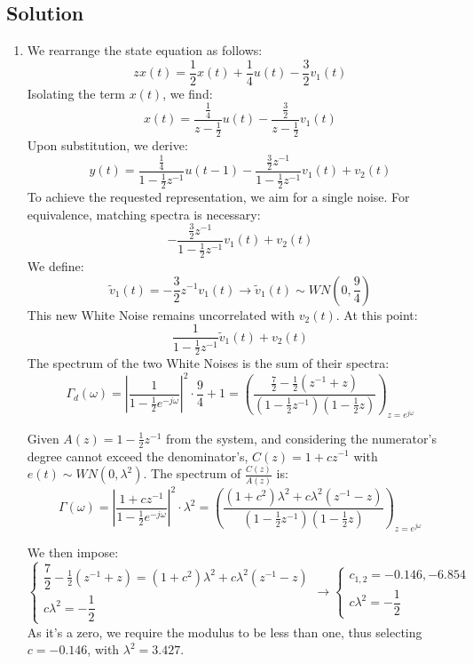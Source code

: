 \subsection*{Solution}
\begin{enumerate}
    \item We rearrange the state equation as follows:
        \[zx(t)=\frac{1}{2}x(t)+\frac{1}{4}u(t)-\frac{3}{2}v_1(t)\]
        Isolating the term $x(t)$, we find:
        \[x(t)=\dfrac{\frac{1}{4}}{z-\frac{1}{2}}u(t)-\dfrac{\frac{3}{2}}{z-\frac{1}{2}}v_1(t)\]
        Upon substitution, we derive:
        \[y(t)=\dfrac{\frac{1}{4}}{1-\frac{1}{2}z^{-1}}u(t-1)-\dfrac{\frac{3}{2}z^{-1}}{1-\frac{1}{2}z^{-1}}v_1(t)+v_2(t)\]
        To achieve the requested representation, we aim for a single noise. 
        For equivalence, matching spectra is necessary:
        \[-\dfrac{\frac{3}{2}z^{-1}}{1-\frac{1}{2}z^{-1}}v_1(t)+v_2(t)\]
        We define:
        \[\tilde{v}_1(t)=-\frac{3}{2}z^{-1}v_1(t)\rightarrow \tilde{v}_1(t)\sim WN\left(0,\dfrac{9}{4}\right)\]
        This new White Noise remains uncorrelated with $v_2(t)$. 
        At this point: 
        \[\dfrac{1}{1-\frac{1}{2}z^{-1}}\tilde{v}_1(t)+v_2(t)\]
        The spectrum of the two White Noises is the sum of their spectra:
        \[\Gamma_d(\omega)=\left\lvert \dfrac{1}{1-\frac{1}{2}e^{-j\omega}}\right\rvert^2 \cdot \dfrac{9}{4}+1=\left(\dfrac{\frac{7}{2}-\frac{1}{2}(z^{-1}+z)}{\left(1-\frac{1}{2}z^{-1}\right)\left(1-\frac{1}{2}z\right)}\right)_{z=e^{j\omega}}\]

        Given $A(z)=1-\frac{1}{2}z^{-1}$ from the system, and considering the numerator's degree cannot exceed the denominator's, $C(z)=1+cz^{-1}$ with $e(t)\sim WN(0,\lambda^2)$. 
        The spectrum of $\frac{C(z)}{A(z)}$ is: 
        \[\Gamma(\omega)=\left\lvert \dfrac{1+cz^{-1}}{1-\frac{1}{2}e^{-j\omega}}\right\rvert^2 \cdot \lambda^2=\left(\dfrac{(1+c^2)\lambda^2+c\lambda^2(z^{-1}-z)}{\left(1-\frac{1}{2}z^{-1}\right)\left(1-\frac{1}{2}z\right)}\right)_{z=e^{j\omega}}\]

        We then impose:
        \[\begin{cases} 
            \dfrac{7}{2}-\frac{1}{2}(z^{-1}+z)=(1+c^2)\lambda^2+c\lambda^2(z^{-1}-z) \\
            c\lambda^2=-\dfrac{1}{2}
        \end{cases}\rightarrow\begin{cases} 
            c_{1,2}=-0.146,-6.854 \\
            c\lambda^2=-\dfrac{1}{2}
        \end{cases}\]
        As it's a zero, we require the modulus to be less than one, thus selecting $c=-0.146$, with $\lambda^2=3.427$. 


\end{enumerate}
